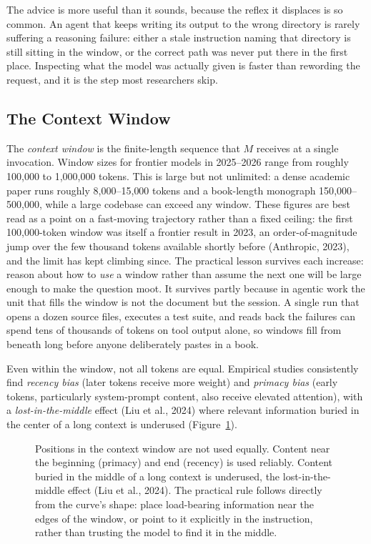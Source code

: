 The advice is more useful than it sounds, because the reflex it displaces is so common.
An agent that keeps writing its output to the wrong directory is rarely suffering a reasoning failure: either a stale instruction naming that directory is still sitting in the window, or the correct path was never put there in the first place.
Inspecting what the model was actually given is faster than rewording the request, and it is the step most researchers skip.

\subsection{The Context Window}

The \emph{context window} is the finite-length sequence that $M$ receives at a single invocation.
Window sizes for frontier models in 2025–2026 range from roughly 100,000 to 1,000,000 tokens.
This is large but not unlimited: a dense academic paper runs roughly 8{,}000--15{,}000 tokens and a book-length monograph 150{,}000--500{,}000, while a large codebase can exceed any window.
These figures are best read as a point on a fast-moving trajectory rather than a fixed ceiling: the first 100,000-token window was itself a frontier result in 2023, an order-of-magnitude jump over the few thousand tokens available shortly before (Anthropic, 2023), and the limit has kept climbing since.
The practical lesson survives each increase: reason about how to \emph{use} a window rather than assume the next one will be large enough to make the question moot.
It survives partly because in agentic work the unit that fills the window is not the document but the session.
A single run that opens a dozen source files, executes a test suite, and reads back the failures can spend tens of thousands of tokens on tool output alone, so windows fill from beneath long before anyone deliberately pastes in a book.

Even within the window, not all tokens are equal.
Empirical studies consistently find \emph{recency bias} (later tokens receive more weight) and \emph{primacy bias} (early tokens, particularly system-prompt content, also receive elevated attention), with a \emph{lost-in-the-middle} effect (Liu et al., 2024) where relevant information buried in the center of a long context is underused (Figure~\ref{figure:LostInTheMiddle}).

\begin{figure}[htb!]
\begin{center}

\caption{Positions in the context window are not used equally.
Content near the beginning (primacy) and end (recency) is used reliably.
Content buried in the middle of a long context is underused, the lost-in-the-middle effect (Liu et al., 2024).
The practical rule follows directly from the curve's shape: place load-bearing information near the edges of the window, or point to it explicitly in the instruction, rather than trusting the model to find it in the middle.}
\label{figure:LostInTheMiddle}
\end{center}
\end{figure}


